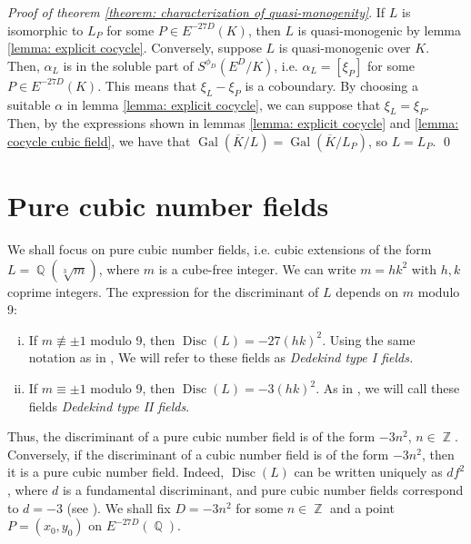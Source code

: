 \documentclass[oneside]{amsart}
\DeclareMathOperator{\disc}{Disc}
\DeclareMathOperator{\QQ}{\mathbb{Q}}
\DeclareMathOperator{\ZZ}{\mathbb{Z}}
\DeclareMathOperator{\gal}{Gal}
\theoremstyle{definition}
\begin{document}
\textit{Proof of theorem \ref{theorem: characterization of quasi-monogenity}}. If $L$ is isomorphic to $L_P$ for some $P \in E^{-27D}(K)$, then $L$ is quasi-monogenic by lemma \ref{lemma: explicit cocycle}. Conversely, suppose $L$ is quasi-monogenic over $K$. Then, $\alpha_L$ is in the soluble part of $S^{\phi_D}(E^D/K)$, i.e. $\alpha_L = [\xi_P]$ for some $P \in E^{-27D}(K)$. This means that $\xi_L - \xi_P$ is a coboundary. By choosing a suitable $\alpha$ in lemma \ref{lemma: explicit cocycle}, we can suppose that $\xi_L = \xi_P$. Then, by the expressions shown in lemmas \ref{lemma: explicit cocycle} and \ref{lemma: cocycle cubic field}, we have that $\gal(\overline{K}/L) = \gal(\overline{K}/L_P)$, so $L = L_P$. \qed

\section{Pure cubic number fields}
\label{section: pure cubic number fields}
We shall focus on pure cubic number fields, i.e. cubic extensions of the form $L = \QQ(\sqrt[3]{m})$, where $m$ is a cube-free integer. We can write $m = hk^2$ with $h, k$ coprime integers. The expression for the discriminant of $L$ depends on $m$ modulo 9:
\begin{enumerate}[(i)]
    \item If $m \not \equiv \pm 1$ modulo 9, then $\disc(L) = -27(hk)^2$. Using the same notation as in \cite[\S 5]{BARRUCAND19707}, We will refer to these fields as \textit{Dedekind type I fields.}
    \item If $m \equiv \pm 1$ modulo 9, then $\disc(L) = -3(hk)^2$. As in \cite[\S 5]{BARRUCAND19707}, we will call these fields \textit{Dedekind type II fields}.
\end{enumerate}
Thus, the discriminant of a pure cubic number field is of the form $-3n^2$, $n \in \ZZ$. Conversely, if the discriminant of a cubic number field is of the form $-3n^2$, then it is a pure cubic number field. Indeed, $\disc(L)$ can be written uniquely as $df^2$, where $d$ is a fundamental discriminant, and pure cubic number fields correspond to $d = -3$ (see \cite[\S 6.4.5]{Cohen}). We shall fix $D = -3n^2$ for some $n \in \ZZ$ and a point $P = (x_0, y_0)$ on $E^{-27D}(\QQ)$.
\end{document}
